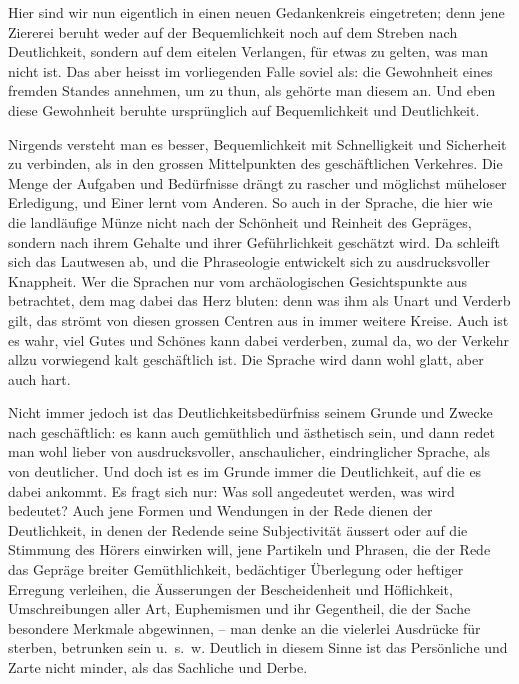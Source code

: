 {Hier sind wir nun eigentlich in einen neuen Gedankenkreis eingetreten; denn jene Ziererei beruht weder auf der Bequemlichkeit noch auf dem Streben nach Deutlichkeit, sondern auf dem eitelen Verlangen, für etwas zu gelten, was man nicht ist. Das aber heisst im vorliegenden Falle soviel als: die Gewohnheit eines fremden Standes annehmen, um zu thun, als gehörte man diesem an. Und eben diese Gewohnheit beruhte ursprünglich auf Bequemlichkeit und Deutlichkeit.

Nirgends versteht man es besser, Bequemlichkeit mit Schnelligkeit und Sicherheit zu verbinden, als in den grossen Mittelpunkten des geschäftlichen Verkehres. Die Menge der Aufgaben und Bedürfnisse drängt zu rascher und möglichst müheloser Erledigung, und Einer lernt vom Anderen. So auch in der Sprache, die hier wie die landläufige Münze nicht nach der Schönheit und Reinheit des Gepräges, sondern nach ihrem Gehalte und ihrer Geführlichkeit geschätzt wird. Da schleift sich das Lautwesen ab, und die Phraseologie entwickelt sich zu ausdrucksvoller Knappheit. Wer die Sprachen nur vom archäologischen Gesichtspunkte aus betrachtet, dem mag dabei das Herz bluten: denn was ihm als Unart und Verderb gilt, das strömt von diesen grossen Centren aus in \label{fp.195} immer weitere Kreise. Auch ist es wahr, viel Gutes und Schönes kann dabei verderben, zumal da, wo der Verkehr allzu vorwiegend kalt geschäftlich ist. Die Sprache wird dann wohl glatt, aber auch hart.

\begin{sloppypar}Nicht immer jedoch ist das Deutlichkeitsbedürfniss seinem Grunde und Zwecke nach geschäftlich: es kann auch gemüthlich und ästhetisch sein, und dann redet man wohl lieber von ausdrucksvoller, anschaulicher, eindringlicher \label{sp.185} Sprache, als von deutlicher. Und doch ist es im Grunde immer die Deutlichkeit, auf die es dabei ankommt. Es fragt sich nur: Was soll angedeutet werden, was wird bedeutet? Auch jene Formen und Wendungen in der Rede dienen der Deutlichkeit, in denen der Redende seine Subjectivität äussert oder auf die Stimmung des Hörers einwirken will, jene Partikeln und Phrasen, die der Rede das Gepräge breiter Gemüthlichkeit, bedächtiger Überlegung oder heftiger Erregung verleihen, die Äusserungen der Bescheidenheit und Höflichkeit, Umschreibungen aller Art, Euphemismen und ihr Gegentheil, die der Sache besondere Merkmale abgewinnen, – man denke an die vielerlei Ausdrücke für sterben, betrunken sein u.~s.~w. Deutlich in diesem Sinne ist das Persönliche und Zarte nicht minder, als das Sachliche und Derbe.\end{sloppypar}

}
